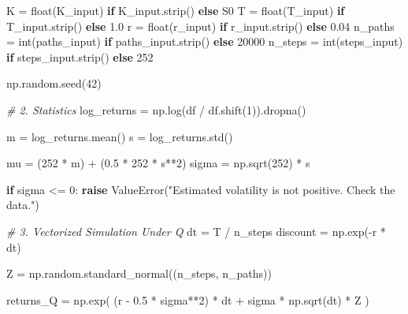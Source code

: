 \documentclass[
  11pt,
]{article}
\newenvironment{Shaded}{}{}
\newcommand{\BuiltInTok}[1]{\textcolor[rgb]{0.00,0.50,0.00}{#1}}
\newcommand{\CommentTok}[1]{\textcolor[rgb]{0.38,0.63,0.69}{\textit{#1}}}
\newcommand{\ControlFlowTok}[1]{\textcolor[rgb]{0.00,0.44,0.13}{\textbf{#1}}}
\newcommand{\DecValTok}[1]{\textcolor[rgb]{0.25,0.63,0.44}{#1}}
\newcommand{\FloatTok}[1]{\textcolor[rgb]{0.25,0.63,0.44}{#1}}
\newcommand{\NormalTok}[1]{#1}
\newcommand{\OperatorTok}[1]{\textcolor[rgb]{0.40,0.40,0.40}{#1}}
\newcommand{\PreprocessorTok}[1]{\textcolor[rgb]{0.74,0.48,0.00}{#1}}
\newcommand{\StringTok}[1]{\textcolor[rgb]{0.25,0.44,0.63}{#1}}
\begin{document}
\begin{Shaded}
\begin{Highlighting}[]
\NormalTok{K }\OperatorTok{=} \BuiltInTok{float}\NormalTok{(K\_input) }\ControlFlowTok{if}\NormalTok{ K\_input.strip() }\ControlFlowTok{else}\NormalTok{ S0}
\NormalTok{T }\OperatorTok{=} \BuiltInTok{float}\NormalTok{(T\_input) }\ControlFlowTok{if}\NormalTok{ T\_input.strip() }\ControlFlowTok{else} \FloatTok{1.0}
\NormalTok{r }\OperatorTok{=} \BuiltInTok{float}\NormalTok{(r\_input) }\ControlFlowTok{if}\NormalTok{ r\_input.strip() }\ControlFlowTok{else} \FloatTok{0.04}
\NormalTok{n\_paths }\OperatorTok{=} \BuiltInTok{int}\NormalTok{(paths\_input) }\ControlFlowTok{if}\NormalTok{ paths\_input.strip() }\ControlFlowTok{else} \DecValTok{20000}
\NormalTok{n\_steps }\OperatorTok{=} \BuiltInTok{int}\NormalTok{(steps\_input) }\ControlFlowTok{if}\NormalTok{ steps\_input.strip() }\ControlFlowTok{else} \DecValTok{252}

\NormalTok{np.random.seed(}\DecValTok{42}\NormalTok{)}

\CommentTok{\# 2. Statistics}
\NormalTok{log\_returns }\OperatorTok{=}\NormalTok{ np.log(df }\OperatorTok{/}\NormalTok{ df.shift(}\DecValTok{1}\NormalTok{)).dropna()}

\NormalTok{m }\OperatorTok{=}\NormalTok{ log\_returns.mean()}
\NormalTok{s }\OperatorTok{=}\NormalTok{ log\_returns.std()}

\NormalTok{mu }\OperatorTok{=}\NormalTok{ (}\DecValTok{252} \OperatorTok{*}\NormalTok{ m) }\OperatorTok{+}\NormalTok{ (}\FloatTok{0.5} \OperatorTok{*} \DecValTok{252} \OperatorTok{*}\NormalTok{ s}\OperatorTok{**}\DecValTok{2}\NormalTok{)}
\NormalTok{sigma }\OperatorTok{=}\NormalTok{ np.sqrt(}\DecValTok{252}\NormalTok{) }\OperatorTok{*}\NormalTok{ s}

\ControlFlowTok{if}\NormalTok{ sigma }\OperatorTok{\textless{}=} \DecValTok{0}\NormalTok{:}
    \ControlFlowTok{raise} \PreprocessorTok{ValueError}\NormalTok{(}\StringTok{"Estimated volatility is not positive. Check the data."}\NormalTok{)}

\CommentTok{\# 3. Vectorized Simulation Under Q}
\NormalTok{dt }\OperatorTok{=}\NormalTok{ T }\OperatorTok{/}\NormalTok{ n\_steps}
\NormalTok{discount }\OperatorTok{=}\NormalTok{ np.exp(}\OperatorTok{{-}}\NormalTok{r }\OperatorTok{*}\NormalTok{ dt)}

\NormalTok{Z }\OperatorTok{=}\NormalTok{ np.random.standard\_normal((n\_steps, n\_paths))}

\NormalTok{returns\_Q }\OperatorTok{=}\NormalTok{ np.exp(}
\NormalTok{    (r }\OperatorTok{{-}} \FloatTok{0.5} \OperatorTok{*}\NormalTok{ sigma}\OperatorTok{**}\DecValTok{2}\NormalTok{) }\OperatorTok{*}\NormalTok{ dt}
    \OperatorTok{+}\NormalTok{ sigma }\OperatorTok{*}\NormalTok{ np.sqrt(dt) }\OperatorTok{*}\NormalTok{ Z}
\NormalTok{)}


\end{Highlighting}
\end{Shaded}
\end{document}
